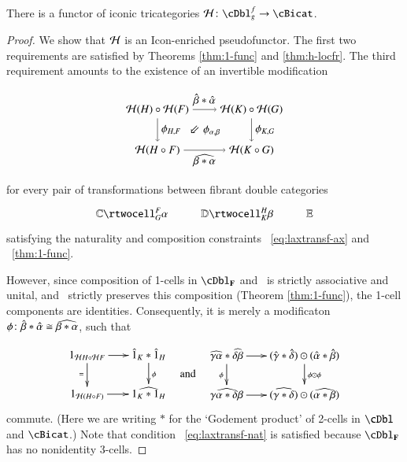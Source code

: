 \documentclass{amsart}
\begin{document}
\begin{thm}\label{thm:h-functor}
  There is a functor of iconic tricategories $\cH\maps \cDbl^f_g\to \cBicat$.
\end{thm}
\begin{proof}
We show that $\mathcal{H}$ is an Icon-enriched pseudofunctor.
The first two requirements are satisfied by Theorems \ref{thm:1-func} and \ref{thm:h-locfr}. The third requirement amounts to the existence of an invertible modification

\begin{equation}
\begin{tikzpicture}[xscale=0.75, yscale=1.3]
\node (tl) at (0,2) {${\cH}(H) \circ {\cH}(F)$};
\node (bl) at (0,1) {${\cH}(H \circ F)$};
\node (tr) at (4,2) {${\cH}(K) \circ {\cH}(G)$};
\node (br) at (4,1) {${\cH}(K \circ G)$};
\draw[->] (tl) to node [above] {$\hat{\beta} * \hat{\alpha}$} (tr);
\draw[->] (tr) to node [right] {$\phi_{K,G}$} (br);
\draw[->] (tl) to node [right] {$\phi_{H,F}$} (bl);
\draw[->] (bl) to node [below] {$\widehat{\be*\al}$} (br);
\node at (2,1.5) {$\Arrow{5} \phi_{\alpha,\beta} $};
\end{tikzpicture}
\end{equation}

for every pair of transformations between fibrant double categories
  \[\vcenter{\xymatrix{\lC \rtwocell^F_G{\al} & \lD \rtwocell^H_K{\be}
      & \lE}}\]
satisfying the naturality and composition constraints ~\ref{eq:laxtransf-ax} and ~\ref{thm:1-func}.

However, since composition of
  1-cells in $\cDbl_{\bf F}$ and \cBicat\ is strictly associative and
  unital, and \cH\ strictly preserves this composition (Theorem \ref{thm:1-func}),
  the 1-cell components are identities. Consequently, it is merely  a modificaton $\phi\colon \hat{\beta} * \hat{\alpha} \cong \widehat{\beta*\alpha}$, such that 
 
 \begin{equation}
        \vcenter{\xymatrix@-.5pc{
        1_{{\cH}H \circ {\cH}F} \ar[r]\ar[d]_{=} &
        \hat{1}_{K}*\hat{1}_{H}\ar[d]^{\phi}\\
        1_{{\cH}(H \circ F)}\ar[r] &
        \widehat{1_{K} *1_{H}}}} \quad\text{and}\quad       
    \vcenter{\xymatrix@-.5pc{
        \widehat{\gm\al}*\widehat{\de\be} \ar[r]\ar[d]_\phi &
        (\gmhat*\dehat)\odot(\alhat*\behat)\ar[d]^{\phi \odot \phi}\\
        \widehat{\gm\al*\de\be}\ar[r] &
        (\widehat{\gm*\de})\odot(\widehat{\al*\be})}}
  \end{equation}
commute. (Here we are writing $*$ for the `Godement product' of 2-cells in $\cDbl$ and $\cBicat$.)    
Note that condition ~\ref{eq:laxtransf-nat} is satisfied because $\cDbl_{\bf F}$ has no nonidentity 3-cells.
  

\end{proof}
\end{document}
